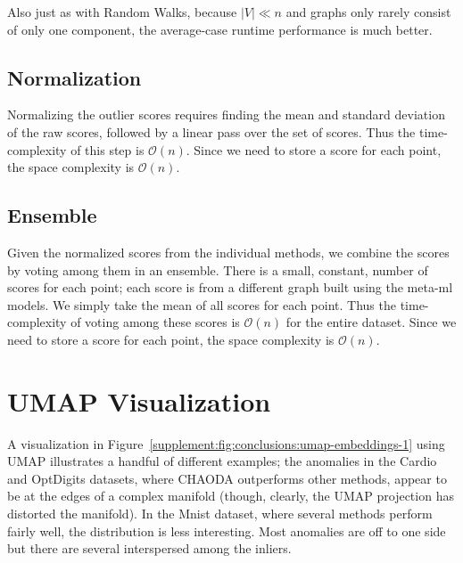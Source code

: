 \documentclass{article}
\begin{document}
Also just as with Random Walks, because $|V| \ll n$ and graphs only rarely consist of only one component, the average-case runtime performance is much better.

\subsection{Normalization}

Normalizing the outlier scores requires finding the mean and standard deviation of the raw scores, followed by a linear pass over the set of scores.
Thus the time-complexity of this step is $\mathcal{O}(n)$.
Since we need to store a score for each point, the space complexity is $\mathcal{O}(n)$.

\subsection{Ensemble}

Given the normalized scores from the individual methods, we combine the scores by voting among them in an ensemble.
There is a small, constant, number of scores for each point; each score is from a different graph built using the meta-ml models.
We simply take the mean of all scores for each point.
Thus the time-complexity of voting among these scores is $\mathcal{O}(n)$ for the entire dataset.
Since we need to store a score for each point, the space complexity is $\mathcal{O}(n)$.


\section{UMAP Visualization}
\label{supplement:sec:umap-visualization}


A visualization in Figure~\ref{supplement:fig:conclusions:umap-embeddings-1} using UMAP illustrates a handful of different examples;
the anomalies in the Cardio and OptDigits datasets, where CHAODA outperforms other methods, appear to be at the edges of a complex manifold (though, clearly, the UMAP projection has distorted the manifold).
In the Mnist dataset, where several methods perform fairly well, the distribution is less interesting.
Most anomalies are off to one side but there are several interspersed among the inliers.
\end{document}
